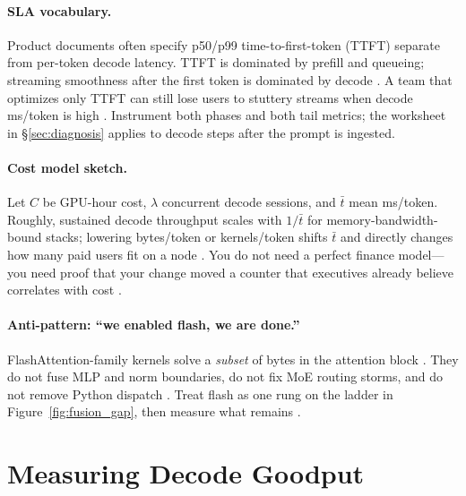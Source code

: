 \paragraph{SLA vocabulary.}
Product documents often specify p50/p99 time-to-first-token (TTFT) separate from per-token decode latency.
TTFT is dominated by prefill and queueing; streaming smoothness after the first token is dominated by decode \citep{fan2025ellieenergyefficie,li2024llminferenceservin}.
A team that optimizes only TTFT can still lose users to stuttery streams when decode ms/token is high \citep{kwon2023vllm}.
Instrument both phases and both tail metrics; the worksheet in \S\ref{sec:diagnosis} applies to decode steps after the prompt is ingested.

\paragraph{Cost model sketch.}
Let $C$ be GPU-hour cost, $\lambda$ concurrent decode sessions, and $\bar{t}$ mean ms/token.
Roughly, sustained decode throughput scales with $1/\bar{t}$ for memory-bandwidth-bound stacks; lowering bytes/token or kernels/token shifts $\bar{t}$ and directly changes how many paid users fit on a node \citep{memoryfloor2026,taxbreak2026,wang2025pdacca541tokenssll}.
You do not need a perfect finance model---you need proof that your change moved a counter that executives already believe correlates with cost \citep{fan2025ellieenergyefficie}.

\paragraph{Anti-pattern: ``we enabled flash, we are done.''}
FlashAttention-family kernels solve a \emph{subset} of bytes in the attention block \citep{dao2022flashattention,dao2023flashdecoding}.
They do not fuse MLP and norm boundaries, do not fix MoE routing storms, and do not remove Python dispatch \citep{taxbreak2026}.
Treat flash as one rung on the ladder in Figure~\ref{fig:fusion_gap}, then measure what remains \citep{memoryfloor2026,yirage2026}.

\section{Measuring Decode Goodput}
\label{sec:goodput_metrics}

